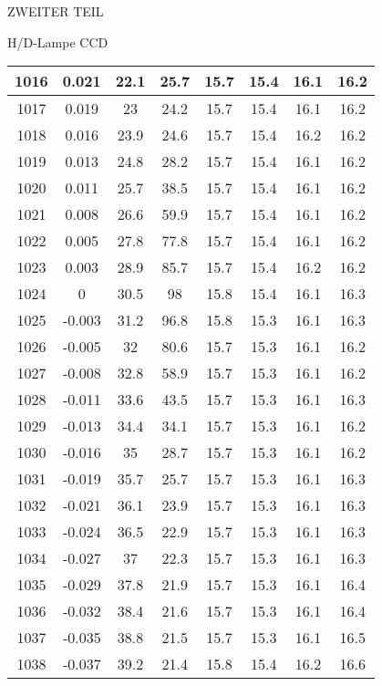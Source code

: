 \begin{appendix}
\begin{chapter}{ZWEITER TEIL}
\begin{section}{H/D-Lampe CCD}
\begin{scriptsize}
\begin{longtable}[htbp]{|c|c|c|c|c|c|c|c|}
            1016 & 0.021 & 22.1 & 25.7 & 15.7 & 15.4 & 16.1 & 16.2 \\ \hline
            1017 & 0.019 & 23 & 24.2 & 15.7 & 15.4 & 16.1 & 16.2 \\ \hline
            1018 & 0.016 & 23.9 & 24.6 & 15.7 & 15.4 & 16.2 & 16.2 \\ \hline
            1019 & 0.013 & 24.8 & 28.2 & 15.7 & 15.4 & 16.1 & 16.2 \\ \hline
            1020 & 0.011 & 25.7 & 38.5 & 15.7 & 15.4 & 16.1 & 16.2 \\ \hline
            1021 & 0.008 & 26.6 & 59.9 & 15.7 & 15.4 & 16.1 & 16.2 \\ \hline
            1022 & 0.005 & 27.8 & 77.8 & 15.7 & 15.4 & 16.1 & 16.2 \\ \hline
            1023 & 0.003 & 28.9 & 85.7 & 15.7 & 15.4 & 16.2 & 16.2 \\ \hline
            1024 & 0 & 30.5 & 98 & 15.8 & 15.4 & 16.1 & 16.3 \\ \hline
            1025 & -0.003 & 31.2 & 96.8 & 15.8 & 15.3 & 16.1 & 16.3 \\ \hline
            1026 & -0.005 & 32 & 80.6 & 15.7 & 15.3 & 16.1 & 16.2 \\ \hline
            1027 & -0.008 & 32.8 & 58.9 & 15.7 & 15.3 & 16.1 & 16.2 \\ \hline
            1028 & -0.011 & 33.6 & 43.5 & 15.7 & 15.3 & 16.1 & 16.3 \\ \hline
            1029 & -0.013 & 34.4 & 34.1 & 15.7 & 15.3 & 16.1 & 16.2 \\ \hline
            1030 & -0.016 & 35 & 28.7 & 15.7 & 15.3 & 16.1 & 16.2 \\ \hline
            1031 & -0.019 & 35.7 & 25.7 & 15.7 & 15.3 & 16.1 & 16.3 \\ \hline
            1032 & -0.021 & 36.1 & 23.9 & 15.7 & 15.3 & 16.1 & 16.3 \\ \hline
            1033 & -0.024 & 36.5 & 22.9 & 15.7 & 15.3 & 16.1 & 16.3 \\ \hline
            1034 & -0.027 & 37 & 22.3 & 15.7 & 15.3 & 16.1 & 16.3 \\ \hline
            1035 & -0.029 & 37.8 & 21.9 & 15.7 & 15.3 & 16.1 & 16.4 \\ \hline
            1036 & -0.032 & 38.4 & 21.6 & 15.7 & 15.3 & 16.1 & 16.4 \\ \hline
            1037 & -0.035 & 38.8 & 21.5 & 15.7 & 15.3 & 16.1 & 16.5 \\ \hline
            1038 & -0.037 & 39.2 & 21.4 & 15.8 & 15.4 & 16.2 & 16.6 \\ \hline

\end{longtable}
\end{scriptsize}
\end{section}
\end{chapter}
\end{appendix}
